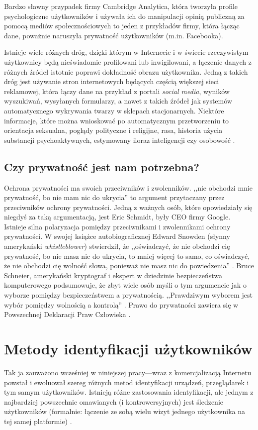 Bardzo sławny przypadek firmy Cambridge Analytica, która tworzyła profile
psychologiczne użytkowników i używała ich do manipulacji opinią publiczną za
pomocą mediów społecznościowych to jeden z przykładów firmy, która łącząc dane,
poważnie naruszyła prywatność użytkowników (m.in. Facebooka).

Istnieje wiele różnych dróg, dzięki którym w Internecie i w świecie rzeczywistym
użytkownicy będą nieświadomie profilowani lub inwigilowani, a łączenie danych z
różnych źródeł istotnie poprawi dokładność obrazu użytkownika. Jedną z takich
dróg jest używanie stron internetowych będących częścią większej sieci
reklamowej, która łączy dane na przykład z portali \emph{social media}, wyników
wyszukiwań, wysyłanych formularzy, a nawet z takich źródeł jak systemów
automatycznego wykrywania twarzy w sklepach stacjonarnych. Niektóre informacje,
które można wnioskować po automatycznym przetworzeniu to orientacja seksualna,
poglądy polityczne i religijne, rasa, historia użycia substancji
psychoaktywnych, estymowany iloraz inteligencji czy osobowość
\cite{kosinski2013private}.

\subsection{Czy prywatność jest nam potrzebna?}
Ochrona prywatności ma swoich przeciwników i zwolenników. ,,nie obchodzi mnie
prywatność, bo nie mam nic do ukrycia'' to argument przytaczany przez
przeciwników ochrony prywatności. Jedną z ważnych osób, które opowiedziały się
niegdyś za taką argumentacją, jest Eric Schmidt, były CEO firmy Google. Istnieje
silna polaryzacja pomiędzy przeciwnikami i zwolennikami ochrony prywatności. W
swojej książce autobiograficznej Edward Snowden (słynny amerykański
\emph{whistleblower}) stwierdził, że ,,oświadczyć, że nie obchodzi cię
prywatność, bo nie masz nic do ukrycia, to mniej więcej to samo, co oświadczyć,
że nie obchodzi cię wolność słowa, ponieważ nie masz nic do powiedzenia''
\cite{snowden2019pamiec}. Bruce Schneier, amerykański kryptograf i ekspert w
dziedzinie bezpieczeństwa komputerowego podsumowuje, że zbyt wiele osób myśli o
tym argumencie jak o wyborze pomiędzy bezpieczeństwem a prywatnością.
,,Prawdziwym wyborem jest wybór pomiędzy wolnością a kontrolą''
\cite{schneier2006eternal}. Prawo do prywatności zawiera się w Powszechnej
Deklaracji Praw Człowieka \cite{united1949universal}.

\section{Metody identyfikacji użytkowników}
Tak ja zauważono wcześniej w niniejszej pracy---wraz z komercjalizacją Internetu
powstał i ewoluował szereg różnych metod identyfikacji urządzeń, przeglądarek i
tym samym użytkowników. Istnieją różne zastosowania identyfikacji, ale jednym z
najbardziej powszechnie omawianych (i kontrowersyjnych) jest śledzenie
użytkowników (formalnie: łączenie ze sobą wielu wizyt jednego użytkownika na tej
samej platformie) \cite[s. 3]{al2020too}.


